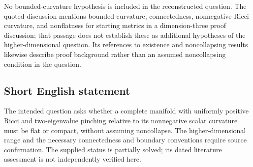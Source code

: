 \documentclass[11pt]{article}
\begin{document}
No bounded-curvature hypothesis is included in the reconstructed question. The quoted discussion mentions bounded curvature, connectedness, nonnegative Ricci curvature, and nonflatness for starting metrics in a dimension-three proof discussion; that passage does not establish these as additional hypotheses of the higher-dimensional question. Its references to existence and noncollapsing results likewise describe proof background rather than an assumed noncollapsing condition in the question.
\subsection{Short English statement}
The intended question asks whether a complete manifold with uniformly positive Ricci and two-eigenvalue pinching relative to its nonnegative scalar curvature must be flat or compact, without assuming noncollapse. The higher-dimensional range and the necessary connectedness and boundary conventions require source confirmation. The supplied status is partially solved; its dated literature assessment is not independently verified here.
\end{document}
